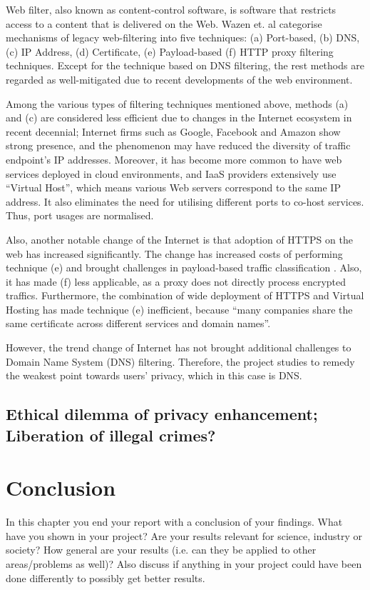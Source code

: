 \documentclass[a4paper,12pt]{article}
\begin{document}
Web filter, also known as content-control software, is software that restricts access to a content that is delivered on the Web.
Wazen et. al categorise mechanisms of legacy web-filtering into five techniques: (a) Port-based, (b) DNS, (c) IP Address, (d) Certificate, (e) Payload-based (f) HTTP proxy filtering techniques\cite{shbair2015efficiently}.
Except for the technique based on DNS filtering, the rest methods are regarded as well-mitigated due to recent developments of the web environment. 

Among the various types of filtering techniques mentioned above, methods (a) and (c) are considered less efficient due to changes in the Internet ecosystem in recent decennial;
Internet firms such as Google, Facebook and Amazon show strong presence\cite{haucap2014google}, and the phenomenon may have reduced the diversity of traffic endpoint's IP addresses.
Moreover, it has become more common to have web services deployed in cloud environments\cite{clouds2018stat}, and IaaS providers extensively use ``Virtual Host\cite{virtual24host}'', which means various Web servers correspond to the same IP address.
It also eliminates the need for utilising different ports to co-host services. Thus, port usages are normalised.

Also, another notable change of the Internet is that adoption of HTTPS on the web has increased significantly\cite{felt2017measuring}.
The change has increased costs of performing technique (e) and brought challenges in payload-based traffic classification \cite{xue2013traffic}.
Also, it has made (f) less applicable, as a proxy does not directly process encrypted traffics\cite{shbair2015efficiently}.
Furthermore, the combination of wide deployment of HTTPS and Virtual Hosting has made technique (e) inefficient, because ``many companies share the same certificate across different services and domain names\cite{shbair2015efficiently}''.

However, the trend change of Internet has not brought additional challenges to Domain Name System (DNS) filtering. Therefore, the project studies to remedy the weakest point towards users' privacy, which in this case is DNS.

\subsection{Ethical dilemma of privacy enhancement; Liberation of illegal crimes?}
\newpage
		
\section{Conclusion}
In this chapter you end your report with a conclusion of your findings. What have you shown in your project? Are your results relevant for science, industry or society? How general are your results (i.e. can they be applied to other areas/problems as well)? Also discuss if anything in your project could have been done differently to possibly get better results. 
\end{document}
